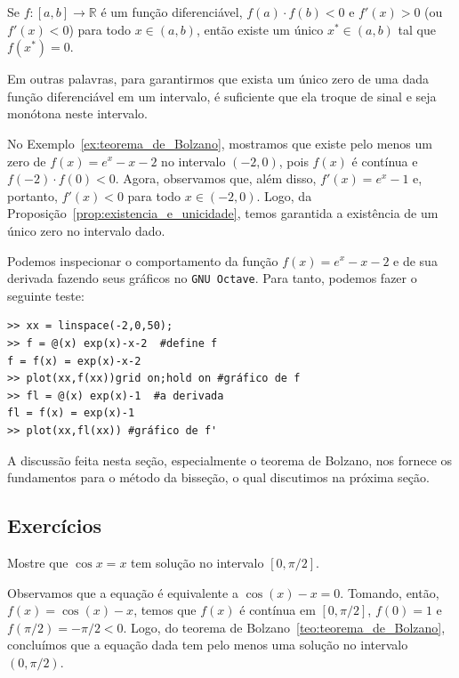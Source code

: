 \begin{prop}\label{prop:existencia_e_unicidade}
Se $f:[a, b]\to\mathbb{R}$ é um função diferenciável, $f(a)\cdot f(b)<0$ e $f'(x)>0$ (ou $f'(x)<0$) para todo $x\in(a, b)$, então existe um único $x^*\in (a, b)$ tal que $f(x^*) = 0$.
\end{prop}

Em outras palavras, para garantirmos que exista um único zero de uma dada função diferenciável em um intervalo, é suficiente que ela troque de sinal e seja monótona neste intervalo.

\begin{ex}
No Exemplo~\ref{ex:teorema_de_Bolzano}, mostramos que existe pelo menos um zero de $f(x) = e^{x}-x-2$ no intervalo $(-2,0)$, pois $f(x)$ é contínua e $f(-2)\cdot f(0) < 0$. Agora, observamos que, além disso, $f'(x)=e^x-1$ e, portanto, $f'(x) < 0$ para todo $x\in(-2,0)$. Logo, da Proposição~\ref{prop:existencia_e_unicidade}, temos garantida a existência de um único zero no intervalo dado.


Podemos inspecionar o comportamento da função $f(x)= e^x - x - 2$ e de sua derivada fazendo seus gráficos no \verb+GNU Octave+. Para tanto, podemos fazer o seguinte teste:
\begin{verbatim}
>> xx = linspace(-2,0,50);
>> f = @(x) exp(x)-x-2  #define f
f = f(x) = exp(x)-x-2
>> plot(xx,f(xx))grid on;hold on #gráfico de f
>> fl = @(x) exp(x)-1  #a derivada
fl = f(x) = exp(x)-1
>> plot(xx,fl(xx)) #gráfico de f'
\end{verbatim}

A discussão feita nesta seção, especialmente o teorema de Bolzano, nos fornece os fundamentos para o método da bisseção, o qual discutimos na próxima seção.

\subsection*{Exercícios}
\begin{exer}\label{exer:existencia_sol1}
  Mostre que $\cos x = x$ tem solução no intervalo $[0, \pi/2]$.
\end{exer}
\begin{resp}

  Observamos que a equação é equivalente a $\cos(x) - x = 0$. Tomando, então, $f(x) = \cos(x) - x$, temos que $f(x)$ é contínua em $[0, \pi/2]$, $f(0) = 1$ e $f(\pi/2) = -\pi/2 < 0$. Logo, do teorema de Bolzano~\ref{teo:teorema_de_Bolzano}, concluímos que a equação dada tem pelo menos uma solução no intervalo $(0, \pi/2)$.


\end{resp}
\end{ex}
